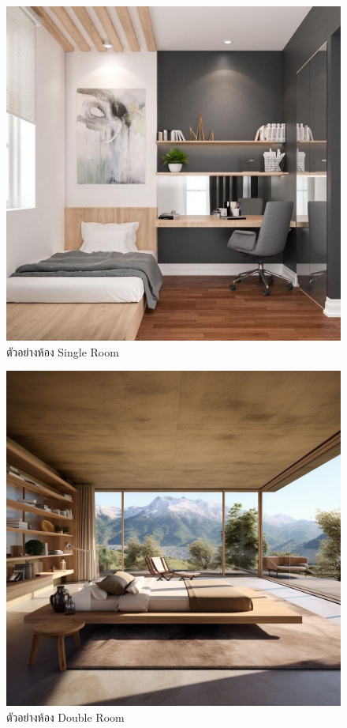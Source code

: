 \documentclass{report}
\begin{document}
\begin{figure}
    \centering
    \includegraphics[scale=0.2]{Single.jpg}
    \caption{ตัวอย่างห้อง Single Room}
    \label{fig:graph6}
\end{figure}

\begin{figure}
    \centering
    \includegraphics[scale=0.1]{Double.jpg}
    \caption{ตัวอย่างห้อง Double Room}
    \label{fig:graph7}
\end{figure}
\end{document}
